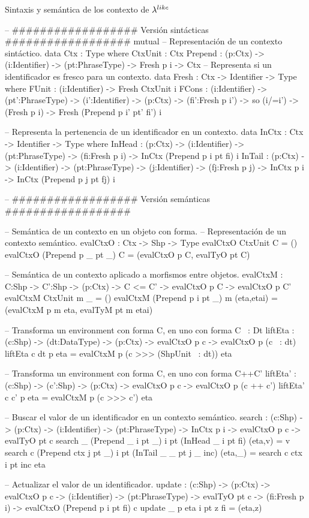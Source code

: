 \noindent Sintaxis y sem\'antica de los contexto de $\lambda^{like}$
\begin{code}
-- ################## Versión sintácticas ##################
mutual
    -- Representación de un contexto sintáctico.
    data Ctx : Type where
        CtxUnit : Ctx
        Prepend : (p:Ctx) -> (i:Identifier) -> (pt:PhraseType) -> 
                  Fresh p i -> Ctx
    -- Representa si un identificador es fresco para un contexto.
    data Fresh : Ctx -> Identifier -> Type where
        FUnit : (i:Identifier) -> Fresh CtxUnit i
        FCons : (i:Identifier) -> (pt':PhraseType) -> (i':Identifier) -> 
                (p:Ctx) -> (fi':Fresh p i') -> so (i/=i') -> (Fresh p i) -> 
                Fresh (Prepend p i' pt' fi') i

-- Representa la pertenencia de un identificador en un contexto.
data InCtx : Ctx -> Identifier -> Type where
    InHead : (p:Ctx) -> (i:Identifier) -> (pt:PhraseType) -> 
             (fi:Fresh p i) -> InCtx (Prepend p i pt fi) i
    InTail : (p:Ctx) -> (i:Identifier) -> (pt:PhraseType) -> 
             (j:Identifier) -> (fj:Fresh p j) -> 
             InCtx p i -> InCtx (Prepend p j pt fj) i

-- ################## Versión semánticas ##################

-- Semántica de un contexto en un objeto con forma.
-- Representación de un contexto semántico.
evalCtxO : Ctx -> Shp -> Type
evalCtxO CtxUnit C = ()
evalCtxO (Prepend p _ pt _) C = (evalCtxO p C, evalTyO pt C)

-- Semántica de un contexto aplicado a morfismos entre objetos.
evalCtxM : {C:Shp} -> {C':Shp} -> 
           (p:Ctx) -> C <= C' -> evalCtxO p C -> evalCtxO p C'
evalCtxM CtxUnit m _ = ()
evalCtxM (Prepend p i pt _) m (eta,etai) = (evalCtxM p m eta, evalTyM pt m etai)

-- Transforma un environment con forma C, en uno con forma C ~: Dt
liftEta : (c:Shp) -> (dt:DataType) -> (p:Ctx) -> 
          evalCtxO p c -> evalCtxO p (c ~: dt)
liftEta c dt p eta = evalCtxM p (c >>> (ShpUnit ~: dt)) eta

-- Transforma un environment con forma C, en uno con forma C++C'
liftEta' : (c:Shp) -> (c':Shp) -> (p:Ctx) -> evalCtxO p c -> 
           evalCtxO p (c ++ c')
liftEta' c c' p eta = evalCtxM p (c >>> c') eta

-- Buscar el valor de un identificador en un contexto semántico.
search : (c:Shp) -> (p:Ctx) -> (i:Identifier) -> (pt:PhraseType) ->
         InCtx p i -> evalCtxO p c -> evalTyO pt c
search _ (Prepend _ i pt _) i pt (InHead _ i pt fi) (eta,v) = v
search c (Prepend ctx j pt _) i pt (InTail _ _ pt j _ inc) (eta,_) = search c ctx i pt inc eta

-- Actualizar el valor de un identificador.
update : (c:Shp) -> (p:Ctx) -> evalCtxO p c -> (i:Identifier) -> 
         (pt:PhraseType) -> evalTyO pt c -> (fi:Fresh p i) -> evalCtxO (Prepend p i pt fi) c
update _ p eta i pt z fi = (eta,z)
\end{code}

